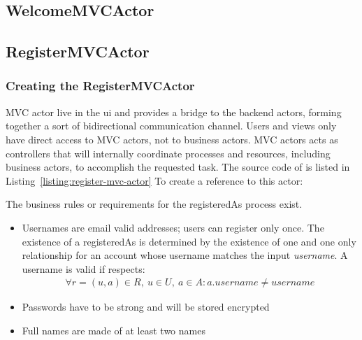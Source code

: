 \subsection{WelcomeMVCActor}
\label{sec:welcomemvcactor}




\subsection{RegisterMVCActor}
\label{sec:registermvcactor}




\subsubsection{Creating the RegisterMVCActor}
\label{sec:creat-regist}

MVC actor live in the ui and provides a bridge to the backend actors,
forming together a sort of bidirectional communication channel. Users
and views only have direct access to MVC actors, not to business
actors. MVC actors acts as controllers that will internally coordinate
processes and resources, including business actors, to accomplish the
requested task. The source code of  is listed
in Listing~\ref{listing:register-mvc-actor}
%
To create a reference to this actor:
% 
\label{listing:register-mvc-actor}
%







The business rules or requirements for the registeredAs process exist.
\begin{itemize}
\item Usernames are email valid addresses; users can register only
  once. The existence of a registeredAs is determined by the existence
  of one and one only  relationship for an account
  whose username matches the input \emph{username}. A username is
  valid if respects:
  \begin{align}
    \forall r = (u, a) \in R,\ u \in U,\ a \in A: a.username \neq
    username
  \end{align}
\item Passwords have to be strong and will be stored encrypted
\item Full names are made of at least two names
\end{itemize}
%

